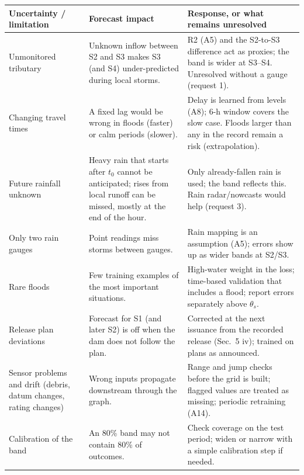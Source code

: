 \begin{longtable}{@{}p{3.3cm}p{6.0cm}p{6.3cm}@{}}
\toprule
\textbf{Uncertainty / limitation} & \textbf{Forecast impact} & \textbf{Response, or what remains unresolved}\\
\midrule\endhead
Unmonitored tributary & Unknown inflow between S2 and S3 makes S3 (and S4) under-predicted during local storms. & R2 (A5) and the S2-to-S3 difference act as proxies; the band is wider at S3--S4. Unresolved without a gauge (request 1). \\
Changing travel times & A fixed lag would be wrong in floods (faster) or calm periods (slower). & Delay is learned from levels (A8); 6-h window covers the slow case. Floods larger than any in the record remain a risk (extrapolation). \\
Future rainfall unknown & Heavy rain that starts after $t_0$ cannot be anticipated; rises from local runoff can be missed, mostly at the end of the hour. & Only already-fallen rain is used; the band reflects this. Rain radar/nowcasts would help (request 3). \\
Only two rain gauges & Point readings miss storms between gauges. & Rain mapping is an assumption (A5); errors show up as wider bands at S2/S3. \\
Rare floods & Few training examples of the most important situations. & High-water weight in the loss; time-based validation that includes a flood; report errors separately above $\theta_s$. \\
Release plan deviations & Forecast for S1 (and later S2) is off when the dam does not follow the plan. & Corrected at the next issuance from the recorded release (Sec.~5 iv); trained on plans as announced. \\
Sensor problems and drift (debris, datum changes, rating changes) & Wrong inputs propagate downstream through the graph. & Range and jump checks before the grid is built; flagged values are treated as missing; periodic retraining (A14). \\
Calibration of the band & An 80\% band may not contain 80\% of outcomes. & Check coverage on the test period; widen or narrow with a simple calibration step if needed. \\
\bottomrule
\end{longtable}


